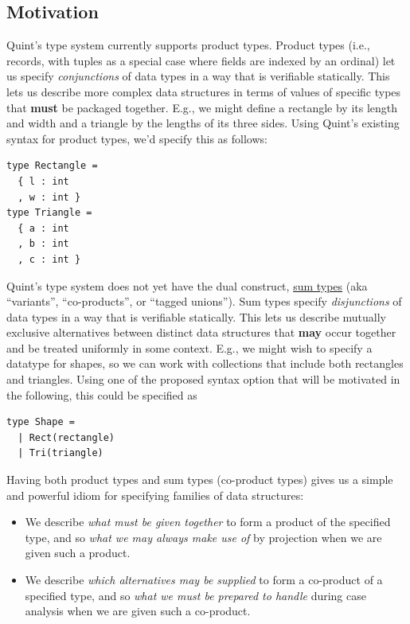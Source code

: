 \documentclass[11pt]{article}
\begin{document}
\subsection{Motivation}
\label{sec:org2103e46}
Quint's type system currently supports product types. Product types
(i.e., records, with tuples as a special case where fields are indexed
by an ordinal) let us specify \emph{conjunctions} of data types in a way that
is verifiable statically. This lets us describe more complex data
structures in terms of values of specific types that \textbf{must} be packaged
together. E.g., we might define a rectangle by its length and width and
a triangle by the lengths of its three sides. Using Quint's existing
syntax for product types, we'd specify this as follows:

\begin{verbatim}
type Rectangle = 
  { l : int
  , w : int }
type Triangle = 
  { a : int
  , b : int
  , c : int }
\end{verbatim}

Quint's type system does not yet have the  dual construct,
\href{https://en.wikipedia.org/wiki/Tagged\_union}{sum types} (aka
``variants'', ``co-products'', or ``tagged unions''). Sum types specify
\emph{disjunctions} of data types in a way that is verifiable statically.
This lets us describe mutually exclusive alternatives between distinct
data structures that \textbf{may} occur together and be treated uniformly in
some context. E.g., we might wish to specify a datatype for shapes, so
we can work with collections that include both rectangles and triangles.
Using one of the proposed syntax option that will be motivated in the
following, this could be specified as

\begin{verbatim}
type Shape =
  | Rect(rectangle)
  | Tri(triangle)
\end{verbatim}

Having both product types and sum types (co-product types) gives us a
simple and powerful idiom for specifying families of data structures:

\begin{itemize}
\item We describe \emph{what must be given together} to form a product of the
specified type, and so \emph{what we may always make use of} by projection
when we are given such a product.
\item We describe \emph{which alternatives may be supplied} to form a co-product
of a specified type, and so \emph{what we must be prepared to handle}
during case analysis when we are given such a co-product.
\end{itemize}
\end{document}
